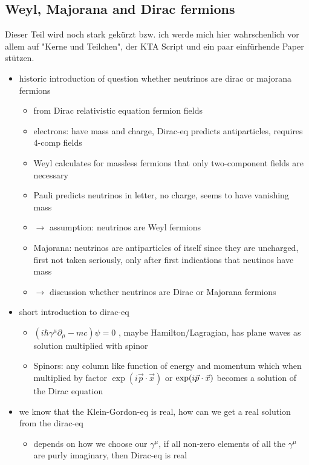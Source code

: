 \subsection{Weyl, Majorana and Dirac fermions}
\label{sec:WMDf}


Dieser Teil wird noch stark gekürzt bzw. ich werde mich hier wahrschenlich vor allem auf "Kerne und Teilchen", der KTA Script und ein paar einfürhende Paper stützen.


\begin{itemize}
\item historic introduction of question whether neutrinos are dirac or majorana fermions
\begin{itemize}
\item from Dirac relativistic equation fermion fields
\item electrons: have mass and charge, Dirac-eq predicts antiparticles, requires 4-comp fields
\item Weyl calculates for massless fermions that only two-component fields are necessary
\item Pauli predicts neutrinos in letter, no charge, seems to have vanishing mass 
\item \(\rightarrow\) assumption: neutrinos  are Weyl fermions
\item Majorana: neutrinos are antiparticles of itself since they are uncharged, first not taken seriously, only after first indications that neutinos have mass
\item \(\rightarrow\) discussion whether neutrinos are Dirac or Majorana fermions
\end{itemize}
\item short introduction to dirac-eq
\begin{itemize}
\item \((i\hbar\gamma^\mu \partial_\mu  - mc)\psi = 0\) , maybe Hamilton/Lagragian, has plane waves as solution multiplied with spinor
\item Spinors: any column like function of energy and momentum which when multiplied by factor \(\exp(i\vec{p}\cdot\vec{x})\) or  \(\exp(\-i\vec{p}\cdot\vec{x})\) becomes a solution of the Dirac equation
\end{itemize}
\item we know that the Klein-Gordon-eq is real, how can we get a real solution from the dirac-eq
\begin{itemize}
\item depends on how we choose our \(\gamma^\mu\), if all non-zero elements of all the \(\gamma^\mu\) are purly imaginary, then Dirac-eq is real

\end{itemize}
\end{itemize}

